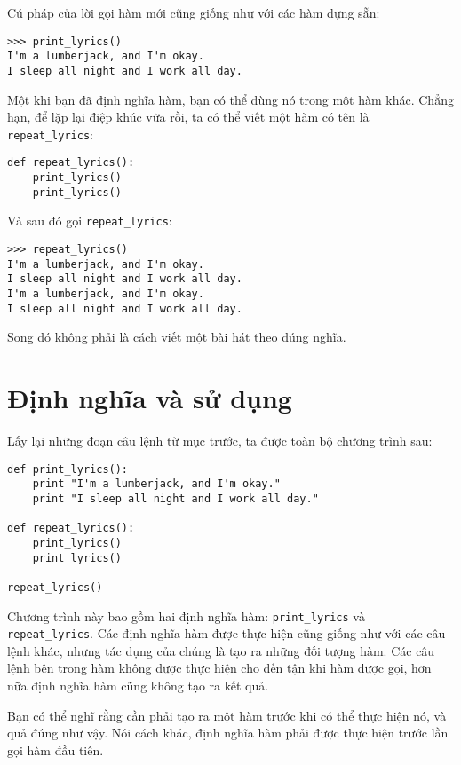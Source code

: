 \documentclass[11pt]{book}
\begin{document}

Cú pháp của lời gọi hàm mới cũng giống như với các hàm
dựng sẵn:

\beforeverb
\begin{verbatim}
>>> print_lyrics()
I'm a lumberjack, and I'm okay.
I sleep all night and I work all day.
\end{verbatim}
\afterverb
%
Một khi bạn đã định nghĩa hàm, bạn có thể dùng nó trong một hàm
khác. Chẳng hạn, để lặp lại điệp khúc vừa rồi, ta có thể viết một
hàm có tên là \verb"repeat_lyrics":

\beforeverb
\begin{verbatim}
def repeat_lyrics():
    print_lyrics()
    print_lyrics()
\end{verbatim}
\afterverb
%
Và sau đó gọi \verb"repeat_lyrics":

\beforeverb
\begin{verbatim}
>>> repeat_lyrics()
I'm a lumberjack, and I'm okay.
I sleep all night and I work all day.
I'm a lumberjack, and I'm okay.
I sleep all night and I work all day.
\end{verbatim}
\afterverb
%
Song đó không phải là cách viết một bài hát theo đúng nghĩa.


\section{Định nghĩa và sử dụng}

Lấy lại những đoạn câu lệnh từ mục trước, ta được toàn bộ chương
trình sau:

\beforeverb
\begin{verbatim}
def print_lyrics():
    print "I'm a lumberjack, and I'm okay."
    print "I sleep all night and I work all day."

def repeat_lyrics():
    print_lyrics()
    print_lyrics()

repeat_lyrics()
\end{verbatim}
\afterverb
%
Chương trình này bao gồm hai định nghĩa hàm: \verb"print_lyrics" và
\verb"repeat_lyrics".  Các định nghĩa hàm được thực hiện cũng giống
như với các câu lệnh khác, nhưng tác dụng của chúng là tạo ra những
đối tượng hàm. Các câu lệnh bên trong hàm không được thực hiện cho
đến tận khi hàm được gọi, hơn nữa định nghĩa hàm cũng không tạo ra
kết quả.


Bạn có thể nghĩ rằng cần phải tạo ra một hàm trước khi có thể thực 
hiện nó, và quả đúng như vậy. Nói cách khác, định nghĩa hàm phải 
được thực hiện trước lần gọi hàm đầu tiên.
\end{document}
